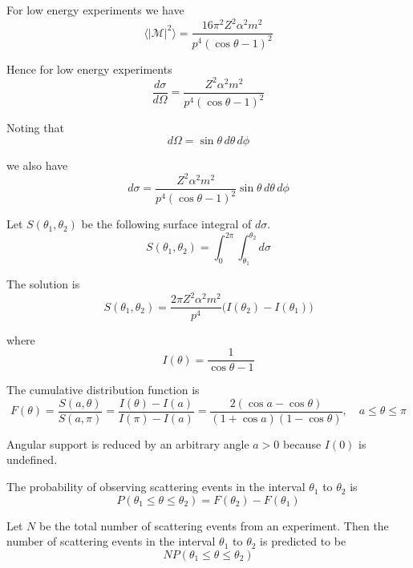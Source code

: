 For low energy experiments we have
\begin{equation*}
\langle|\mathcal{M}|^2\rangle=\frac{16\pi^2Z^2\alpha^2m^2}{p^4(\cos\theta-1)^2}
\end{equation*}

Hence for low energy experiments
\begin{equation*}
\frac{d\sigma}{d\Omega}=\frac{Z^2\alpha^2m^2}{p^4(\cos\theta-1)^2}
\end{equation*}

Noting that
\begin{equation*}
d\Omega=\sin\theta\,d\theta\,d\phi
\end{equation*}

we also have
\begin{equation*}
d\sigma=\frac{Z^2\alpha^2m^2}{p^4(\cos\theta-1)^2}
\sin\theta\,d\theta\,d\phi
\end{equation*}

Let $S(\theta_1,\theta_2)$ be the following surface integral of $d\sigma$.
\begin{equation*}
S(\theta_1,\theta_2)=\int_0^{2\pi}\int_{\theta_1}^{\theta_2}d\sigma
\end{equation*}

The solution is
\begin{equation*}
S(\theta_1,\theta_2)=\frac{2\pi Z^2\alpha^2m^2}{p^4}\bigl(I(\theta_2)-I(\theta_1)\bigr)
\end{equation*}

where
\begin{equation*}
I(\theta)=\frac{1}{\cos\theta-1}
\end{equation*}

The cumulative distribution function is
\begin{equation*}
F(\theta)
=\frac{S(a,\theta)}{S(a,\pi)}
=\frac{I(\theta)-I(a)}{I(\pi)-I(a)}
=\frac{2(\cos a-\cos\theta)}{(1+\cos a)(1-\cos\theta)},
\quad
a\le\theta\le\pi
\end{equation*}

Angular support is reduced by an arbitrary angle $a>0$ because $I(0)$ is undefined.

\bigskip
The probability of observing scattering events
in the interval $\theta_1$ to $\theta_2$ is
\begin{equation*}
P(\theta_1\le\theta\le\theta_2)=F(\theta_2)-F(\theta_1)
\end{equation*}

Let $N$ be the total number of scattering events from an experiment.
Then the number of scattering events in the interval $\theta_1$ to $\theta_2$ is predicted to be
\begin{equation*}
NP(\theta_1\le\theta\le\theta_2)
\end{equation*}

